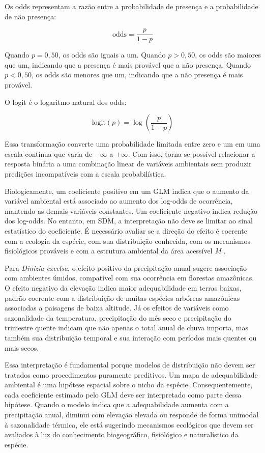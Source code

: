 Os odds representam a razão entre a probabilidade de presença e a probabilidade de não presença:

\begin{equation}
	\text{odds} =
	\frac{p}{1-p}
\end{equation}

Quando $p = 0{,}50$, os odds são iguais a um. Quando $p > 0{,}50$, os odds são maiores que um, indicando que a presença é mais provável que a não presença. Quando $p < 0{,}50$, os odds são menores que um, indicando que a não presença é mais provável.

O logit é o logaritmo natural dos odds:

\begin{equation}
	\text{logit}(p) =
	\log\left(\frac{p}{1-p}\right)
\end{equation}

Essa transformação converte uma probabilidade limitada entre zero e um em uma escala contínua que varia de $-\infty$ a $+\infty$. Com isso, torna-se possível relacionar a resposta binária a uma combinação linear de variáveis ambientais sem produzir predições incompatíveis com a escala probabilística.

Biologicamente, um coeficiente positivo em um GLM indica que o aumento da variável ambiental está associado ao aumento dos log-odds de ocorrência, mantendo as demais variáveis constantes. Um coeficiente negativo indica redução dos log-odds. No entanto, em SDM, a interpretação não deve se limitar ao sinal estatístico do coeficiente. É necessário avaliar se a direção do efeito é coerente com a ecologia da espécie, com sua distribuição conhecida, com os mecanismos fisiológicos prováveis e com a estrutura ambiental da área acessível \textit{M} \citep{guisan2000predictive,elith2009species,peterson2011ecological}.

Para \textit{Dinizia excelsa}, o efeito positivo da precipitação anual sugere associação com ambientes úmidos, compatível com sua ocorrência em florestas amazônicas. O efeito negativo da elevação indica maior adequabilidade em terras baixas, padrão coerente com a distribuição de muitas espécies arbóreas amazônicas associadas a paisagens de baixa altitude. Já os efeitos de variáveis como sazonalidade da temperatura, precipitação do mês seco e precipitação do trimestre quente indicam que não apenas o total anual de chuva importa, mas também sua distribuição temporal e sua interação com períodos mais quentes ou mais secos.

Essa interpretação é fundamental porque modelos de distribuição não devem ser tratados como procedimentos puramente preditivos. Um mapa de adequabilidade ambiental é uma hipótese espacial sobre o nicho da espécie. Consequentemente, cada coeficiente estimado pelo GLM deve ser interpretado como parte dessa hipótese. Quando o modelo indica que a adequabilidade aumenta com a precipitação anual, diminui com elevação elevada ou responde de forma unimodal à sazonalidade térmica, ele está sugerindo mecanismos ecológicos que devem ser avaliados à luz do conhecimento biogeográfico, fisiológico e naturalístico da espécie.

